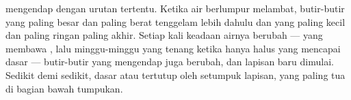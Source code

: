  mengendap dengan urutan tertentu. Ketika air berlumpur melambat,
butir-butir yang paling besar dan paling berat tenggelam lebih dahulu dan
yang paling kecil dan paling ringan paling akhir. Setiap kali keadaan airnya
berubah ---  yang membawa , lalu minggu-minggu yang tenang ketika
hanya  halus yang mencapai dasar --- butir-butir yang mengendap juga
berubah, dan lapisan baru dimulai. Sedikit demi sedikit, dasar  atau
 tertutup oleh setumpuk lapisan, yang paling tua di bagian bawah
tumpukan.

